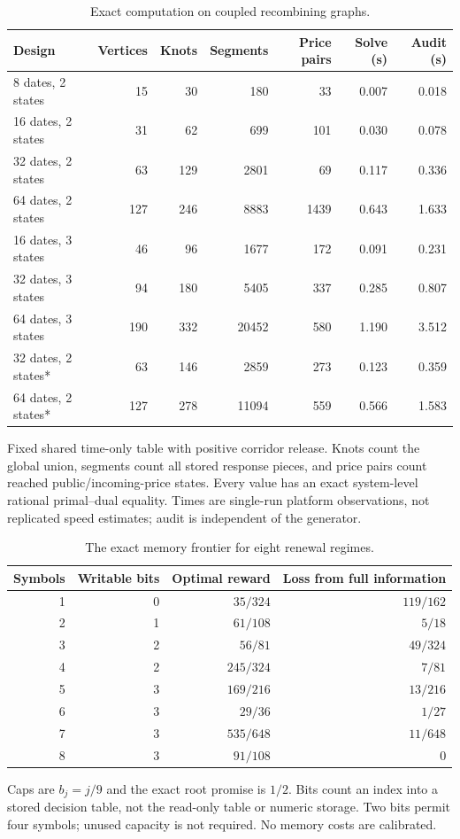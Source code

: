 \begin{table}[!htbp]\centering
\caption{Exact computation on coupled recombining graphs.}\label{tab:r29-scaling}
\begin{tabular}{lrrrrrr}\toprule
Design & Vertices & Knots & Segments & Price pairs & Solve (s) & Audit (s)\\\midrule
8 dates, 2 states & 15 & 30 & 180 & 33 & 0.007 & 0.018 \\
16 dates, 2 states & 31 & 62 & 699 & 101 & 0.030 & 0.078 \\
32 dates, 2 states & 63 & 129 & 2801 & 69 & 0.117 & 0.336 \\
64 dates, 2 states & 127 & 246 & 8883 & 1439 & 0.643 & 1.633 \\
16 dates, 3 states & 46 & 96 & 1677 & 172 & 0.091 & 0.231 \\
32 dates, 3 states & 94 & 180 & 5405 & 337 & 0.285 & 0.807 \\
64 dates, 3 states & 190 & 332 & 20452 & 580 & 1.190 & 3.512 \\
32 dates, 2 states* & 63 & 146 & 2859 & 273 & 0.123 & 0.359 \\
64 dates, 2 states* & 127 & 278 & 11094 & 559 & 0.566 & 1.583 \\
\bottomrule\end{tabular}
\begin{minipage}{.97\linewidth}\small *Fixed shared time-only table with positive corridor release. Knots count the global union, segments count all stored response pieces, and price pairs count reached public/incoming-price states. Every value has an exact system-level rational primal--dual equality. Times are single-run platform observations, not replicated speed estimates; audit is independent of the generator.\end{minipage}
\end{table}
\begin{table}[!htbp]\centering
\caption{The exact memory frontier for eight renewal regimes.}\label{tab:r29-memory}
\begin{tabular}{rrrr}\toprule
Symbols & Writable bits & Optimal reward & Loss from full information\\\midrule
1 & 0 & $35/324$ & $119/162$ \\
2 & 1 & $61/108$ & $5/18$ \\
3 & 2 & $56/81$ & $49/324$ \\
4 & 2 & $245/324$ & $7/81$ \\
5 & 3 & $169/216$ & $13/216$ \\
6 & 3 & $29/36$ & $1/27$ \\
7 & 3 & $535/648$ & $11/648$ \\
8 & 3 & $91/108$ & $0$ \\
\bottomrule\end{tabular}
\begin{minipage}{.9\linewidth}\small Caps are $b_j=j/9$ and the exact root promise is $1/2$. Bits count an index into a stored decision table, not the read-only table or numeric storage. Two bits permit four symbols; unused capacity is not required. No memory costs are calibrated.\end{minipage}
\end{table}
